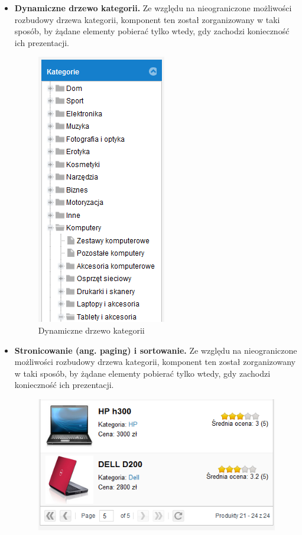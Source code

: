 \begin{itemize}
\item\textbf{Dynamiczne drzewo kategorii.} Ze względu na nieograniczone możliwości rozbudowy drzewa kategorii, komponent ten został zorganizowany w taki sposób, by żądane elementy pobierać tylko wtedy, gdy zachodzi konieczność ich prezentacji.
\begin{figure}[h]
	\centering
	\includegraphics[scale=0.7]{images/Kategorie.png}
	\caption{Dynamiczne drzewo kategorii}
\end{figure}
\item\textbf{Stronicowanie (ang. paging) i sortowanie.} Ze względu na nieograniczone możliwości rozbudowy drzewa kategorii, komponent ten został zorganizowany w taki sposób, by żądane elementy pobierać tylko wtedy, gdy zachodzi konieczność ich prezentacji.
\begin{figure}[h]
	\centering
	\includegraphics[scale=0.7]{images/paging.png}

\end{figure}
\end{itemize}

